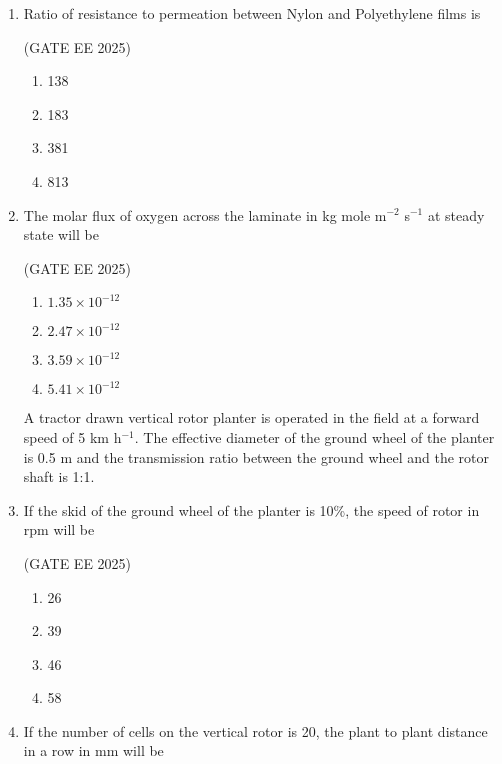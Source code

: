 \documentclass[journal,12pt,onecolumn]{IEEEtran}
\theoremstyle{remark}
\begin{document}
\begin{enumerate}
\item Ratio of resistance to permeation between Nylon and Polyethylene films is

\hfill(GATE EE 2025)

\begin{multicols}{4}
\begin{enumerate}
\item 138
\item 183
\item 381
\item 813
\end{enumerate}
\end{multicols}

\item The molar flux of oxygen across the laminate in kg mole m$^{-2}$ s$^{-1}$ at steady state will be

\hfill(GATE EE 2025)

\begin{multicols}{4}
\begin{enumerate}
\item $1.35 \times 10^{-12}$
\item $2.47 \times 10^{-12}$
\item $3.59 \times 10^{-12}$
\item $5.41 \times 10^{-12}$
\end{enumerate}
\end{multicols}

A tractor drawn vertical rotor planter is operated in the field at a forward speed of 5 km h$^{-1}$. The effective diameter of the ground wheel of the planter is 0.5 m and the transmission ratio between the ground wheel and the rotor shaft is 1:1.
\newpage
\item If the skid of the ground wheel of the planter is 10\%, the speed of rotor in rpm will be

\hfill(GATE EE 2025)

\begin{multicols}{4}
\begin{enumerate}
\item 26
\item 39
\item 46
\item 58
\end{enumerate}
\end{multicols}

\item If the number of cells on the vertical rotor is 20, the plant to plant distance in a row in mm will be


\end{enumerate}
\end{document}
